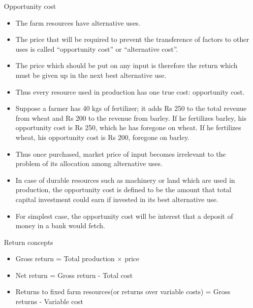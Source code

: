 \documentclass[12pt,ignorenonframetext,aspectratio=169]{beamer}
\providecommand{\tightlist}{%
  \setlength{\itemsep}{0pt}\setlength{\parskip}{0pt}}
\begin{document}
\begin{frame}{Opportunity cost}
\protect\hypertarget{opportunity-cost}{}
\begin{itemize}
\tightlist
\item
  The farm resources have alternative uses.
\item
  The price that will be required to prevent the transference of factors
  to other uses is called ``opportunity cost'' or ``alternative cost''.
\item
  The price which should be put on any input is therefore the return
  which must be given up in the next best alternative use.
\item
  Thus every resource used in production has one true cost: opportunity
  cost.
\item
  Suppose a farmer has 40 kgs of fertilizer; it adds Rs 250 to the total
  revenue from wheat and Rs 200 to the revenue from barley. If he
  fertilizes barley, his opportunity cost is Rs 250, which he has
  foregone on wheat. If he fertilizes wheat, his opportunity cost is Rs
  200, foregone on barley.
\end{itemize}
\end{frame}

\begin{frame}{}
\protect\hypertarget{section-1}{}
\begin{itemize}
\tightlist
\item
  Thus once purchased, market price of input becomes irrelevant to the
  problem of its allocation among alternative uses.
\item
  In case of durable resources such as machinery or land which are used
  in production, the opportunity cost is defined to be the amount that
  total capital investment could earn if invested in its best
  alternative use.
\item
  For simplest case, the opportunity cost will be interest that a
  deposit of money in a bank would fetch.
\end{itemize}
\end{frame}

\begin{frame}{Return concepts}
\protect\hypertarget{return-concepts}{}
\begin{itemize}
\tightlist
\item
  Gross return = Total production \(\times\) price
\item
  Net return = Gross return - Total cost
\item
  Returns to fixed farm resources(or returns over variable costs) =
  Gross returns - Variable cost
\end{itemize}
\end{frame}
\end{document}
